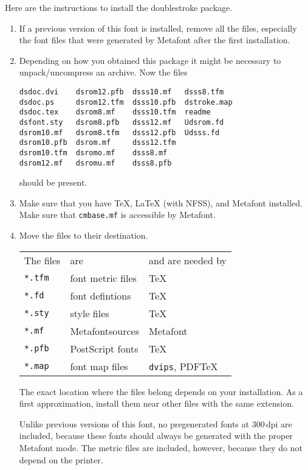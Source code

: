 \documentclass[a4paper]{article}
\newcommand{\MF}{\textsf{Metafont}}
\begin{document}
Here are the instructions to install the doublestroke package.

\begin{enumerate}
\item If a previous version of this font is installed, remove all
the files, especially the font files that were generated by
\MF{} after the first installation.

\item Depending on how you obtained this package it might be
necessary to unpack/uncompress an archive. Now the files
\begin{verbatim}
dsdoc.dvi    dsrom12.pfb  dsss10.mf   dsss8.tfm
dsdoc.ps     dsrom12.tfm  dsss10.pfb  dstroke.map
dsdoc.tex    dsrom8.mf    dsss10.tfm  readme
dsfont.sty   dsrom8.pfb   dsss12.mf   Udsrom.fd
dsrom10.mf   dsrom8.tfm   dsss12.pfb  Udsss.fd
dsrom10.pfb  dsrom.mf     dsss12.tfm
dsrom10.tfm  dsromo.mf    dsss8.mf
dsrom12.mf   dsromu.mf    dsss8.pfb
\end{verbatim}
should be present.

\item Make sure that you have \TeX, \LaTeX{} (with NFSS), and \MF{}
installed. Make sure that \texttt{cmbase.mf} is accessible by \MF.

\item Move the files to their destination.

\begin{tabular}{lll}
The files        & are                & and are needed by \\[1ex]
\texttt{*.tfm}   & font metric files  & \TeX \\
\texttt{*.fd}    & font defintions    & \TeX \\
\texttt{*.sty}   & style files        & \TeX \\
\texttt{*.mf}    & \MF sources        & \MF \\
\texttt{*.pfb}   & PostScript fonts   & \TeX \\
\texttt{*.map}   & font map files     & \texttt{dvips}, PDF\TeX
\end{tabular}

The exact location where the files belong depends on your
installation. As a first approximation, install them
near other files with the same extension.

Unlike previous versions of this font, no pregenerated
fonts at 300\,dpi are included, because
these fonts should always be generated with the proper
\MF{} mode. The metric files are included, however, because
they do not depend on the printer.


\end{enumerate}
\end{document}
